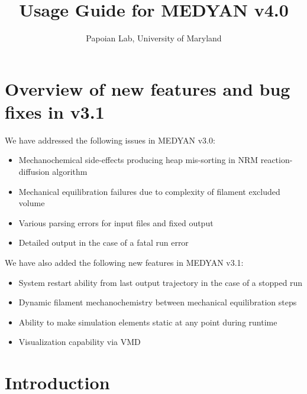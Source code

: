 \documentclass[11pt, oneside]{article}   	%
\title{Usage Guide for MEDYAN \textbf{v4.0}}
\author{Papoian Lab, University of Maryland}
\date{}							%
\begin{document}
\maketitle



\tableofcontents

\newpage	

\section {Overview of new features and bug fixes in v3.1}

We have addressed the following issues in MEDYAN v3.0:

\begin{itemize}

\item Mechanochemical side-effects producing heap mis-sorting in NRM reaction-diffusion algorithm
\item Mechanical equilibration failures due to complexity of filament excluded volume
\item Various parsing errors for input files and fixed output
\item Detailed output in the case of a fatal run error

\end{itemize} 

\noindent We have also added the following new features in MEDYAN v3.1:

\begin{itemize}

\item System restart ability from last output trajectory in the case of a stopped run
\item Dynamic filament mechanochemistry between mechanical equilibration steps 
\item Ability to make simulation elements static at any point during runtime
\item Visualization capability via VMD

\end{itemize}

\section {Introduction}
\end{document}
